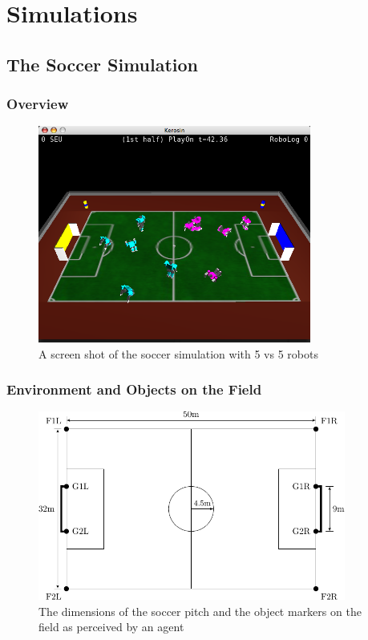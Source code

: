 \chapter{Simulations}

\section{The Soccer Simulation}

\subsection{Overview}

\begin{figure}[htp]
  \centering
  \includegraphics[width=0.8\textwidth]{fig/soccersim}
  \caption{A screen shot of the soccer simulation with 5 vs 5 robots}
  \label{fig:soccersim}
\end{figure}

\subsection{Environment and Objects on the Field}

\begin{figure}[htp]
  \centering
  \includegraphics[width=0.9\textwidth]{fig/pitch}
  \caption{The dimensions of the soccer pitch and the object markers on the field as perceived by an agent}
  \label{fig:pitch}
\end{figure}


